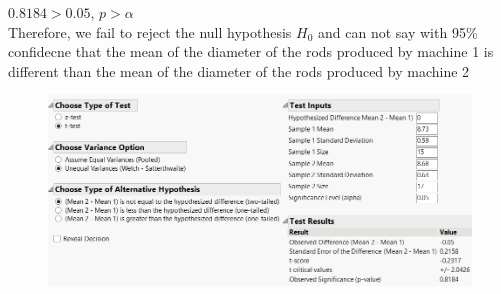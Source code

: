 \documentclass[14pt]{article}
\begin{document}
\begin{enumerate}
\begin{enumerate}[(a)]
$0.8184 > 0.05$, $p > \alpha$ \\

Therefore, we fail to reject the null hypothesis $H_0$ and can not say with 95\% confidecne that the mean of the diameter of the rods produced by machine 1 is different than the mean of the diameter of the rods produced by machine 2

\begin{figure}[h]
\includegraphics[scale=0.75]{exam3Pics/1-3-b.PNG}
\centering
\end{figure}

\end{enumerate}
\end{enumerate}
\pagebreak
\end{document}
